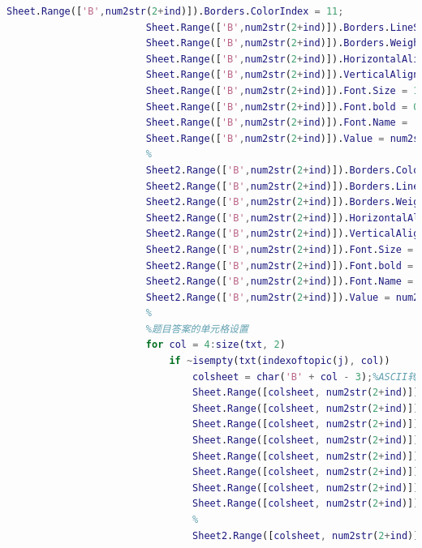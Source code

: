 \begin{lstlisting}[language=Matlab]
                        Sheet.Range(['B',num2str(2+ind)]).Borders.ColorIndex = 11;
                        Sheet.Range(['B',num2str(2+ind)]).Borders.LineStyle = 1;
                        Sheet.Range(['B',num2str(2+ind)]).Borders.Weight = 3;
                        Sheet.Range(['B',num2str(2+ind)]).HorizontalAlignment = 1;
                        Sheet.Range(['B',num2str(2+ind)]).VerticalAlignment = 1;
                        Sheet.Range(['B',num2str(2+ind)]).Font.Size = 10.5;
                        Sheet.Range(['B',num2str(2+ind)]).Font.bold = 0;
                        Sheet.Range(['B',num2str(2+ind)]).Font.Name = '宋体';
                        Sheet.Range(['B',num2str(2+ind)]).Value = num2str(ind);
                        %
                        Sheet2.Range(['B',num2str(2+ind)]).Borders.ColorIndex = 11;
                        Sheet2.Range(['B',num2str(2+ind)]).Borders.LineStyle = 1;
                        Sheet2.Range(['B',num2str(2+ind)]).Borders.Weight = 3;
                        Sheet2.Range(['B',num2str(2+ind)]).HorizontalAlignment = 1;
                        Sheet2.Range(['B',num2str(2+ind)]).VerticalAlignment = 1;
                        Sheet2.Range(['B',num2str(2+ind)]).Font.Size = 10.5;
                        Sheet2.Range(['B',num2str(2+ind)]).Font.bold = 0;
                        Sheet2.Range(['B',num2str(2+ind)]).Font.Name = '宋体';
                        Sheet2.Range(['B',num2str(2+ind)]).Value = num2str(ind);
                        %
                        %题目答案的单元格设置
                        for col = 4:size(txt, 2)
                            if ~isempty(txt(indexoftopic(j), col))
                                colsheet = char('B' + col - 3);%ASCII转码，还可用setstr命令，并且，字符串比较大小时，是比较的ASCII码
                                Sheet.Range([colsheet, num2str(2+ind)]).Borders.ColorIndex = 11;
                                Sheet.Range([colsheet, num2str(2+ind)]).Borders.LineStyle = 1;
                                Sheet.Range([colsheet, num2str(2+ind)]).Borders.Weight = 3;
                                Sheet.Range([colsheet, num2str(2+ind)]).HorizontalAlignment = 1;
                                Sheet.Range([colsheet, num2str(2+ind)]).VerticalAlignment = 1;
                                Sheet.Range([colsheet, num2str(2+ind)]).Font.Size = 10.5;
                                Sheet.Range([colsheet, num2str(2+ind)]).Font.bold = 0;
                                Sheet.Range([colsheet, num2str(2+ind)]).Font.Name = '宋体';
                                %
                                Sheet2.Range([colsheet, num2str(2+ind)]).Borders.ColorIndex = 11;

\end{lstlisting}
